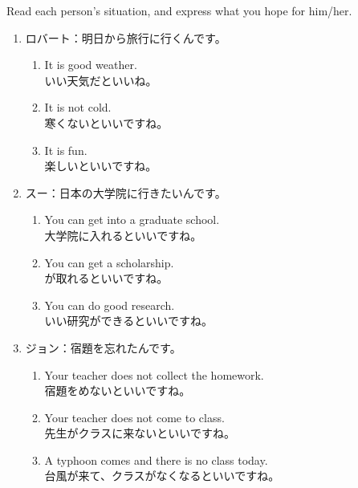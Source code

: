 \documentclass[notoc,notitlepage]{tufte-book}
\begin{document}
\begin{ex}
  Read each person's situation, and express what you hope for him/her.

  \begin{enumerate}
    \item ロバート：明日から旅行に行くんです。
      \begin{enumerate}
        \item It is good weather. \\
          いい天気だといいね。
        \item It is not cold. \\
          寒くないといいですね。
        \item It is fun. \\
          楽しいといいですね。
      \end{enumerate}
    \item スー：日本の大学院に行きたいんです。
      \begin{enumerate}
        \item You can get into a graduate school. \\
          大学院に入れるといいですね。
        \item You can get a scholarship. \\
          が取れるといいですね。
        \item You can do good research. \\
          いい研究ができるといいですね。
      \end{enumerate}
    \item ジョン：宿題を忘れたんです。
      \begin{enumerate}
        \item Your teacher does not collect the homework. \\
          宿題をめないといいですね。
        \item Your teacher does not come to class. \\
          先生がクラスに来ないといいですね。
        \item A typhoon comes and there is no class today. \\
          台風が来て、クラスがなくなるといいですね。
      \end{enumerate}
  \end{enumerate}
\end{ex}

\end{document}
